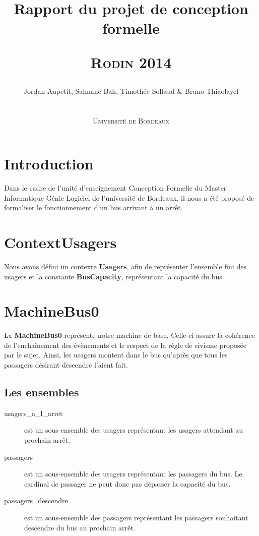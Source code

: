 \documentclass[a4paper,titlepage]{report}
\title{Rapport du projet de conception formelle
	\begin{center}
		\textsc{Rodin 2014}
	\end{center}
}
\author{Jordan Aupetit, Salmane Bah, Timothée Sollaud \& Bruno Thiaolayel\\
	\\
	\\ \textsc{Université de Bordeaux}
}
\begin{document}
	\maketitle
	\tableofcontents
	\newpage
	\thispagestyle{empty}	
	\newpage
\markboth{}{}
\section{Introduction}
	Dans le cadre de l'unité d'enseignement Conception Formelle du Master Informatique Génie Logiciel de l'université de Bordeaux, il nous a été proposé de formaliser le fonctionnement d'un bus arrivant à un arrêt.



\section{ContextUsagers}
	Nous avons défini un contexte \textbf{Usagers}, afin de représenter l'ensemble fini des usagers et la constante \textbf{BusCapacity}, représentant la capacité du bus.\\

\section{MachineBus0}
	La \textbf{MachineBus0} représente notre machine de base. Celle-ci assure la cohérence de l'enchaînement des évènements et le respect de la règle de civisme proposée par le sujet. Ainsi, les usagers montent dans le bus qu'après que tous les passagers désirant descendre l'aient fait.\\
	
	\subsection{Les ensembles}
		\begin{description}
			\item[usagers\_a\_l\_arret] est un sous-ensemble des usagers représentant les usagers attendant au prochain arrêt.\\
			\item[passagers] est un sous-ensemble des usagers représentant les passagers du bus. Le cardinal de passager ne peut donc pas dépasser la capacité du bus.\\
			\item[passagers\_descendre] est un sous-ensemble des passagers représentant les passagers souhaitant descendre du bus au prochain arrêt.\\
		\end{description}
		
\end{document}
